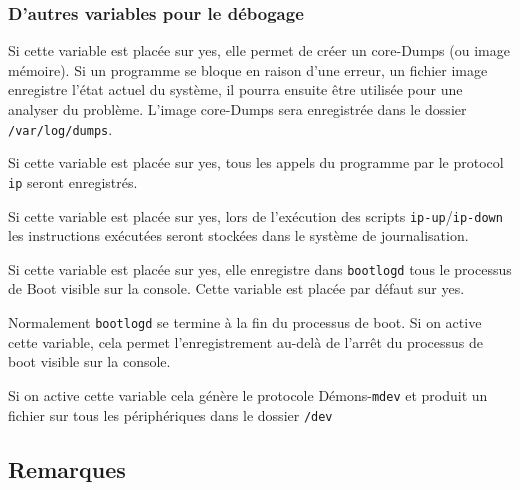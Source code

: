\subsubsection{D'autres variables pour le débogage}

\begin{description}

  Si cette variable est placée sur \og{}yes\fg{}, elle permet de créer un core-Dumps
  (ou image mémoire). Si un programme se bloque en raison d'une erreur, un
  fichier image enregistre l'état actuel du système, il pourra ensuite être
  utilisée pour une analyser du problème. L'image core-Dumps sera enregistrée
  dans le dossier \texttt{/var/log/dumps}.


  Si cette variable est placée sur \og{}yes\fg{}, tous les appels du programme par
  le protocol \texttt{ip} seront enregistrés.


  Si cette variable est placée sur \og{}yes\fg{}, lors de l'exécution des scripts
  \texttt{ip-up}/\texttt{ip-down} les instructions exécutées seront stockées dans
  le système de journalisation.


  Si cette variable est placée sur \og{}yes\fg{}, elle enregistre dans \texttt{bootlogd}
  tous le processus de Boot visible sur la console. Cette variable est placée
  par défaut sur \og{}yes\fg{}.


  Normalement \texttt{bootlogd} se termine à la fin du processus de boot. Si on active
  cette variable, cela permet l'enregistrement au-delà de l'arrêt du processus
  de boot visible sur la console.


  Si on active cette variable cela génère le protocole Démons-\texttt{mdev} et produit
  un fichier sur tous les périphériques dans le dossier \texttt{/dev}
\end{description}


\subsection{Remarques}


